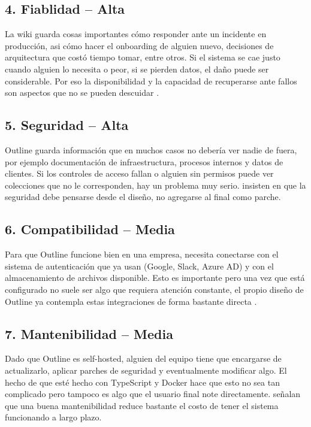 \documentclass{report}
\begin{document}
\subsection*{4. Fiablidad -- Alta}

La wiki guarda cosas importantes cómo responder ante un incidente en producción, asi cómo hacer el onboarding de alguien nuevo, decisiones de arquitectura que costó tiempo tomar, entre otros. Si el sistema se cae justo cuando alguien lo necesita o peor, si se pierden datos, el daño puede ser considerable. Por eso la disponibilidad y la capacidad de recuperarse ante fallos son aspectos que no se pueden descuidar \cite{outline2025}.

\subsection*{5. Seguridad -- Alta}

Outline guarda información que en muchos casos no debería ver nadie de fuera, por ejemplo documentación de infraestructura, procesos internos y datos de clientes. Si los controles de acceso fallan o alguien sin permisos puede ver colecciones que no le corresponden, hay un problema muy serio. \cite{pressman2020} insisten en que la seguridad debe pensarse desde el diseño, no agregarse al final como parche.

\subsection*{6. Compatibilidad -- Media }

Para que Outline funcione bien en una empresa, necesita conectarse con el sistema de autenticación que ya usan (Google, Slack, Azure AD) y con el almacenamiento de archivos disponible. Esto es importante pero una vez que está configurado no suele ser algo que requiera atención constante, el propio diseño de Outline ya contempla estas integraciones de forma bastante directa \cite{outline2025}.

\subsection*{7. Mantenibilidad -- Media }

Dado que Outline es self-hosted, alguien del equipo tiene que encargarse de actualizarlo, aplicar parches de seguridad y eventualmente modificar algo. El hecho de que esté hecho con TypeScript y Docker hace que esto no sea tan complicado pero tampoco es algo que el usuario final note directamente. \cite{pressman2020} señalan que una buena mantenibilidad reduce bastante el costo de tener el sistema funcionando a largo plazo.
\end{document}

